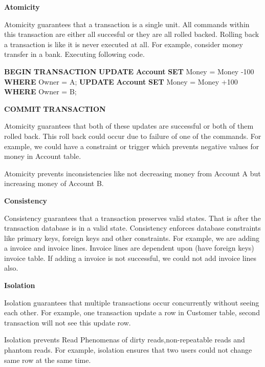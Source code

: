 \documentclass[
  letterpaper,
  DIV=11,
  numbers=noendperiod]{scrreprt}
\newenvironment{Shaded}{\begin{snugshade}}{\end{snugshade}}
\newcommand{\ControlFlowTok}[1]{\textcolor[rgb]{0.00,0.23,0.31}{\textbf{#1}}}
\newcommand{\DecValTok}[1]{\textcolor[rgb]{0.68,0.00,0.00}{#1}}
\newcommand{\KeywordTok}[1]{\textcolor[rgb]{0.00,0.23,0.31}{\textbf{#1}}}
\newcommand{\NormalTok}[1]{\textcolor[rgb]{0.00,0.23,0.31}{#1}}
\newcommand{\OperatorTok}[1]{\textcolor[rgb]{0.37,0.37,0.37}{#1}}
\begin{document}
\textbf{Atomicity}

Atomicity guarantees that a transaction is a single unit. All commands
within this transaction are either all succesful or they are all rolled
backed. Rolling back a transaction is like it is never executed at all.
For example, consider money transfer in a bank. Executing following
code.

\begin{Shaded}
\begin{Highlighting}[]
\ControlFlowTok{BEGIN} \KeywordTok{TRANSACTION}    
    \KeywordTok{UPDATE} \KeywordTok{Account}
    \KeywordTok{SET}\NormalTok{ Money }\OperatorTok{=}\NormalTok{ Money }\OperatorTok{{-}}\DecValTok{100}
    \KeywordTok{WHERE}\NormalTok{ Owner }\OperatorTok{=}\NormalTok{ A;}
    \KeywordTok{UPDATE} \KeywordTok{Account}
    \KeywordTok{SET}\NormalTok{ Money }\OperatorTok{=}\NormalTok{ Money }\OperatorTok{+}\DecValTok{100}
    \KeywordTok{WHERE}\NormalTok{ Owner }\OperatorTok{=}\NormalTok{ B;}

\KeywordTok{COMMIT} \KeywordTok{TRANSACTION}    
\end{Highlighting}
\end{Shaded}

Atomicity guarantees that both of these updates are successful or both
of them rolled back. This roll back could occur due to failure of one of
the commands. For example, we could have a constraint or trigger which
prevents negative values for money in Account table.

Atomicity prevents inconsistencies like not decreasing money from
Account A but increasing money of Account B.

\textbf{Consistency}

Consistency guarantees that a transaction preserves valid states. That
is after the transaction database is in a valid state. Consistency
enforces database constraints like primary keys, foreign keys and other
constraints. For example, we are adding a invoice and invoice lines.
Invoice lines are dependent upon (have foreign keys) invoice table. If
adding a invoice is not successful, we could not add invoice lines also.

\textbf{Isolation}

Isolation guarantees that multiple transactions occur concurrently
without seeing each other. For example, one transaction update a row in
Customer table, second transaction will not see this update row.

Isolation prevents Read Phenomenas of dirty reads,non-repeatable reads
and phantom reads. For example, isolation ensures that two users could
not change same row at the same time.
\end{document}
